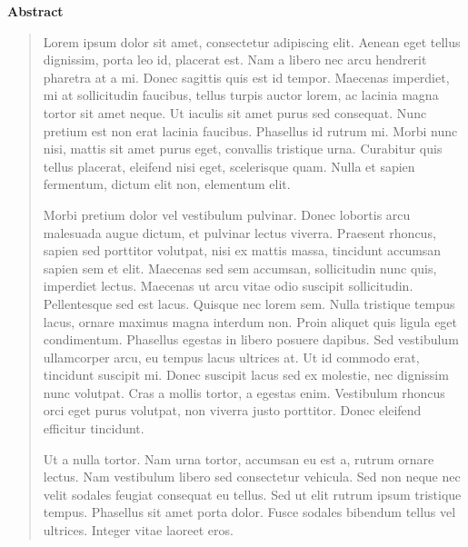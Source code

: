 \vspace*{2cm}
\pagestyle{empty}
{\bfseries \Huge Abstract }
\vspace{1.5cm}

\begin{quotation}
Lorem ipsum dolor sit amet, consectetur adipiscing elit. Aenean eget tellus
dignissim, porta leo id, placerat est. Nam a libero nec arcu hendrerit pharetra
at a mi. Donec sagittis quis est id tempor. Maecenas imperdiet, mi at
sollicitudin faucibus, tellus turpis auctor lorem, ac lacinia magna tortor sit
amet neque. Ut iaculis sit amet purus sed consequat. Nunc pretium est non erat
lacinia faucibus. Phasellus id rutrum mi. Morbi nunc nisi, mattis sit amet
purus eget, convallis tristique urna. Curabitur quis tellus placerat, eleifend
nisi eget, scelerisque quam. Nulla et sapien fermentum, dictum elit non,
elementum elit.

Morbi pretium dolor vel vestibulum pulvinar. Donec lobortis arcu malesuada
augue dictum, et pulvinar lectus viverra. Praesent rhoncus, sapien sed
porttitor volutpat, nisi ex mattis massa, tincidunt accumsan sapien sem et
elit. Maecenas sed sem accumsan, sollicitudin nunc quis, imperdiet lectus.
Maecenas ut arcu vitae odio suscipit sollicitudin. Pellentesque sed est lacus.
Quisque nec lorem sem. Nulla tristique tempus lacus, ornare maximus magna
interdum non. Proin aliquet quis ligula eget condimentum. Phasellus egestas in
libero posuere dapibus. Sed vestibulum ullamcorper arcu, eu tempus lacus
ultrices at. Ut id commodo erat, tincidunt suscipit mi. Donec suscipit lacus
sed ex molestie, nec dignissim nunc volutpat. Cras a mollis tortor, a egestas
enim. Vestibulum rhoncus orci eget purus volutpat, non viverra justo porttitor.
Donec eleifend efficitur tincidunt.

Ut a nulla tortor. Nam urna tortor, accumsan eu est a, rutrum ornare lectus.
Nam vestibulum libero sed consectetur vehicula. Sed non neque nec velit sodales
feugiat consequat eu tellus. Sed ut elit rutrum ipsum tristique tempus.
Phasellus sit amet porta dolor. Fusce sodales bibendum tellus vel ultrices.
Integer vitae laoreet eros.



\end{quotation}
